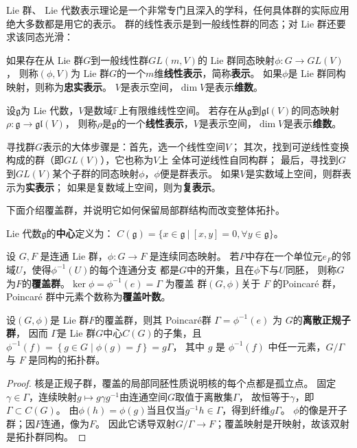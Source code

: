  Lie 群、 Lie 代数表示理论是一个非常专门且深入的学科，任何具体群的实际应用
绝大多数都是用它的表示。
群的线性表示是到一般线性群的同态；对 Lie 群还要求该同态光滑：
\begin{definition}
    如果存在从 Lie 群$G$到一般线性群$GL(m,V)$的 Lie 群同态映射$\phi:G\to GL(V)$，
    则称$(\phi,V)$为 Lie 群$G$的一个$m$维\textbf{线性表示}，简称\textbf{表示}。
    如果$\phi$是 Lie 群同构映射，则称为\textbf{忠实表示}。
    $V$是表示空间，$\dim V$是表示\textbf{维数}。
\end{definition}

\begin{definition}
    设$\mathfrak{g}$为 Lie 代数，$V$是数域$\mathbb{F}$上有限维线性空间。
    若存在从$\mathfrak{g}$到$\mathfrak{gl}(V)$的同态映射$\rho : \mathfrak{g}\to \mathfrak{gl}(V)$，
    则称$\rho$是$\mathfrak{g}$的一个\textbf{线性表示}，$V$是表示空间，$\dim V$是表示\textbf{维数}。
\end{definition}

寻找群$G$表示的大体步骤是：首先，选一个线性空间$V$；
其次，找到可逆线性变换构成的群（即$GL(V)$），它也称为$V$上
全体可逆线性自同构群；
最后，寻找到$G$到$GL(V)$某个子群的同态映射$\phi$，$\phi$便是群表示。
如果$V$是实数域上空间，则群表示为\textbf{实表示}；
如果是复数域上空间，则为\textbf{复表示}。

下面介绍覆盖群，并说明它如何保留局部群结构而改变整体拓扑。
\begin{definition}
     Lie 代数$\mathfrak{g}$的\textbf{中心}定义为：
    $C(\mathfrak{g})=\{x\in \mathfrak{g}\ |\ [x,y]=0,\forall y\in\mathfrak{g}\}$。
\end{definition}

\begin{definition}
    设 $G, F$ 是连通 Lie 群，$\phi: G \rightarrow F$ 是连续同态映射。
    若$F$中存在一个单位元$e_F$的邻域$U$，使得$\phi^{-1}(U)$的每个连通分支
    都是$G$中的开集，且在$\phi$下与$U$同胚，
    则称$G$为$F$的\textbf{覆盖群}。$\ker  \phi=\phi^{-1}(e)=\Gamma$ 为覆盖
    群$(G, \phi)$关于 $F$ 的{Poincar\'e 群}，Poincar\'e 群中元素个数称为\textbf{覆盖叶数}。
\end{definition}

\begin{theorem}
    设$(G, \phi)$是 Lie 群$F$的覆盖群，则其 Poincar\'e群 $\Gamma=\phi^{-1}(e)$ 为 $G$的\textbf{离散正规子群}，
    因而 $\Gamma$是 Lie 群$G$中心$C (G)$的子集，且 $\phi^{-1}(f)=\left\{g \in G \mid \phi(g)=f\right\}=g \Gamma$，
    其中 $g$ 是 $\phi^{-1}(f)$ 中任一元素，$G / \Gamma$ 与 $F$ 是同构的拓扑群。
\end{theorem}
\begin{proof}
核是正规子群，覆盖的局部同胚性质说明核的每个点都是孤立点。
固定$\gamma\in\Gamma$，连续映射$g\mapsto g\gamma g^{-1}$由连通空间$G$取值于离散集$\Gamma$，
故恒等于$\gamma$，即$\Gamma\subset C(G)$。
由$\phi(h)=\phi(g)$当且仅当$g^{-1}h\in\Gamma$，得到纤维$g\Gamma$。
$\phi$的像是开子群；因$F$连通，像为$F$。
因此它诱导双射$G/\Gamma\to F$；覆盖映射是开映射，故该双射是拓扑群同构。
\end{proof}


